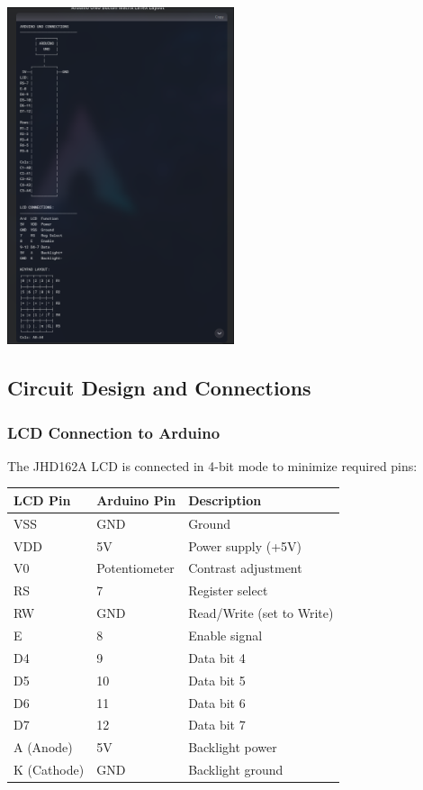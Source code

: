 \documentclass{article}
\begin{document}
\begin{center}
    \includegraphics[width=0.5\textwidth]{Figs/Circuit.jpg} %
\end{center}

\subsection{Circuit Design and Connections}
\subsubsection{LCD Connection to Arduino}
The JHD162A LCD is connected in 4-bit mode to minimize required pins:

\begin{center}
\begin{tabular}{|l|l|l|}
\hline
LCD Pin & Arduino Pin & Description \\
\hline
VSS & GND & Ground \\
VDD & 5V & Power supply (+5V) \\
V0 & Potentiometer & Contrast adjustment \\
RS & 7 & Register select \\
RW & GND & Read/Write (set to Write) \\
E & 8 & Enable signal \\
D4 & 9 & Data bit 4 \\
D5 & 10 & Data bit 5 \\
D6 & 11 & Data bit 6 \\
D7 & 12 & Data bit 7 \\
A (Anode) & 5V & Backlight power \\
K (Cathode) & GND & Backlight ground \\
\hline
\end{tabular}
\end{center}
\end{document}
